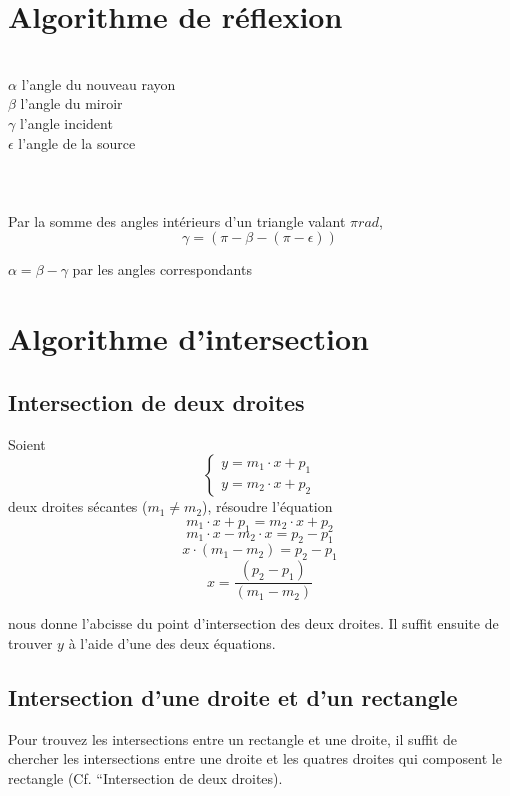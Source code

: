 \documentclass[a4paper,11pt]{report}
\begin{document}
\section[Réflexion]{Algorithme de réflexion}
 \\
$\alpha$ l'angle du nouveau rayon \\
$\beta$ l'angle du miroir \\
$\gamma$ l'angle incident \\
$\epsilon$ l'angle de la source \\ \\ \\ \\
Par la somme des angles intérieurs d'un triangle valant $\pi rad$, \\
$$\gamma = (\pi - \beta - (\pi - \epsilon))$$

$\alpha = \beta - \gamma$ par les angles correspondants
\section[Intersection]{Algorithme d'intersection}

\subsection[Deux droites]{Intersection de deux droites}
Soient \\
$$\begin{cases}
	y = m_1 \cdot x + p_1 \\
	y = m_2 \cdot x + p_2
\end{cases}$$
deux droites sécantes ($m_1 \ne m_2$), résoudre l'équation \\
$$m_1 \cdot x + p_1 = m_2 \cdot x + p_2$$
$$m_1 \cdot x - m_2 \cdot x = p_2 - p_1 $$
$$x \cdot (m_1 - m_2) = p_2 - p_1$$
$$x = \frac{(p_2 - p_1)}{(m_1 - m_2)}$$

nous donne l'abcisse du point d'intersection des deux droites.
Il suffit ensuite de trouver $y$ à l'aide d'une des deux équations.

\subsection[Droite et rectangle]{Intersection d'une droite et d'un rectangle}
Pour trouvez les intersections entre un rectangle et une droite, il suffit de
chercher les intersections entre une droite et les quatres droites qui composent
le rectangle (Cf. ``Intersection de deux droites).
\end{document}
